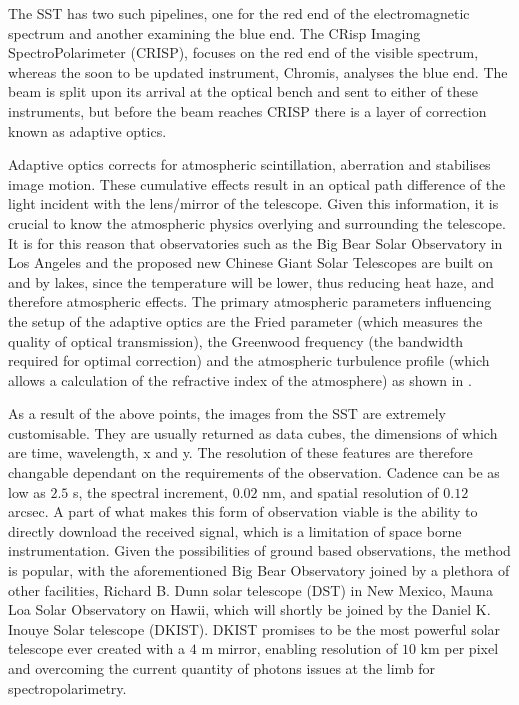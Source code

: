 The SST has two such pipelines, one for the red end of the electromagnetic spectrum and another examining the blue end.
The CRisp Imaging SpectroPolarimeter (CRISP), focuses on the red end of the visible spectrum, whereas the soon to be updated instrument, Chromis, analyses the blue end.
The beam is split upon its arrival at the optical bench and sent to either of these instruments, but before the beam reaches CRISP there is a layer of correction known as adaptive optics.

Adaptive optics corrects for atmospheric scintillation, aberration and stabilises image motion.
These cumulative effects result in an optical path difference of the light incident with the lens/mirror of the telescope.
Given this information, it is crucial to know the atmospheric physics overlying and surrounding the telescope.
It is for this reason that observatories such as the Big Bear Solar Observatory \citep{Cao2010} in Los Angeles and the proposed new Chinese Giant Solar Telescopes \citep{Liu2014} are built on and by lakes, since the temperature will be lower, thus reducing heat haze, and therefore atmospheric effects.
The primary atmospheric parameters influencing the setup of the adaptive optics are the Fried parameter (which measures the quality of optical transmission), the Greenwood frequency (the bandwidth required for optimal correction) and the atmospheric turbulence profile (which allows a calculation of the refractive index of the atmosphere) as shown in \cite{Rimmele2011}.

As a result of the above points, the images from the SST are extremely customisable.
They are usually returned as data cubes, the dimensions of which are time, wavelength, x and y.
The resolution of these features are therefore changable dependant on the requirements of the observation.
Cadence can be as low as $2.5$ s, the spectral increment, $0.02$ nm, and spatial resolution of $0.12$ arcsec.
A part of what makes this form of observation viable is the ability to directly download the received signal, which is a limitation of space borne instrumentation.
Given the possibilities of ground based observations, the method is popular, with the aforementioned Big Bear Observatory joined by a plethora of other facilities, Richard B. Dunn solar telescope (DST) in New Mexico, Mauna Loa Solar Observatory on Hawii, which will shortly be joined by the Daniel K. Inouye Solar telescope (DKIST).
DKIST promises to be the most powerful solar telescope ever created with a $4$ m mirror, enabling resolution of $10$ km per pixel and overcoming the current quantity of photons issues at the limb for spectropolarimetry.



